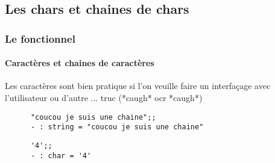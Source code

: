   \subsection{Les chars et chaines de chars}
\begin{frame}[fragile]
    \frametitle{Le fonctionnel}
    \framesubtitle{Caractères et chaines de caractères}
    Les caractères sont bien pratique si l'on veuille faire un interfaçage avec l'utilisateur ou d'autre ... truc (*caugh* ocr *caugh*)\\
    \begin{minipage}[t]{10cm}
      \begin{lstlisting}
      "coucou je suis une chaine";;
      - : string = "coucou je suis une chaine"
      \end{lstlisting}
    \end{minipage}
    \begin{minipage}[t]{5cm}
      \begin{lstlisting}
      '4';;
      - : char = '4'
      \end{lstlisting}
    \end{minipage}
\end{frame}
